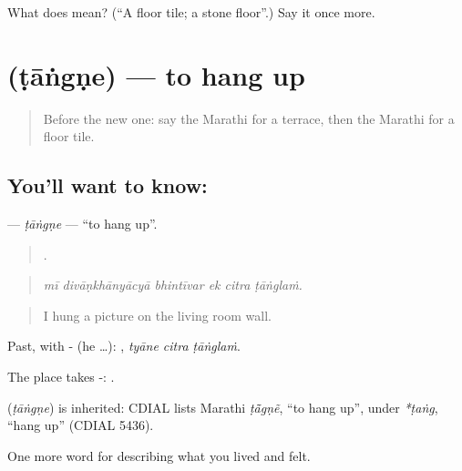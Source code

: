 \begin{tcolorbox}[breakable,colback=teal!4,colframe=teal!35!black,title={Before you move on}]
What does  mean? (\textquotedblleft{}A floor tile; a stone floor\textquotedblright{}.) Say it once more.
\end{tcolorbox}
\section[\texorpdfstring{\mr{टांगणे} (ṭāṅgṇe)}{टांगणे (ṭāṅgṇe)}]{ (ṭāṅgṇe) — to hang up}

\label{lesson:MR-C522-tangne}



\begin{quote}
Before the new one: say the Marathi for a terrace, then the Marathi for a floor tile.
\end{quote}

\subsection*{You'll want to know: }
\textbf{} — \emph{ṭāṅgṇe} — \textquotedblleft{}to hang up\textquotedblright{}.

\begin{quote}
     .
\end{quote}

\begin{quote}
\emph{mī divāṇkhānyācyā bhintīvar ek citra ṭāṅglaṁ.}
\end{quote}

\begin{quote}
I hung a picture on the living room wall.
\end{quote}

Past, with - (he …):   , \emph{tyāne citra ṭāṅglaṁ}.

The place takes -:  .

\begin{cousinweb}
\textbf{} (\emph{ṭāṅgṇe}) is inherited: CDIAL lists Marathi \emph{ṭā̃gṇẽ}, \textquotedblleft{}to hang up\textquotedblright{}, under \emph{*ṭaṅg}, \textquotedblleft{}hang up\textquotedblright{} (CDIAL 5436).
\end{cousinweb}

\begin{grammarlens}[title={What you've built}]
One more word for describing what you lived and felt.
\end{grammarlens}

